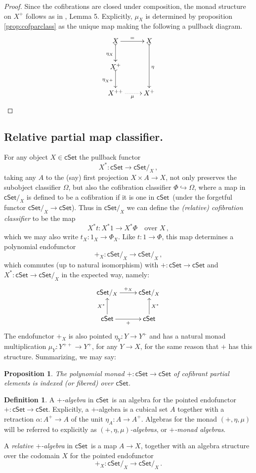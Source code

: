 \documentclass[11pt,reqno]{amsart}
\newcommand{\cSet}{\ensuremath{\mathsf{cSet}}}
\newcommand{\hook}{\ensuremath{\hookrightarrow}}
\newcommand{\ra}{\ensuremath{\rightarrow}}
\renewcommand{\to}{\ensuremath{\rightarrow}}
\newcommand{\too}{\ensuremath{\longrightarrow}}
\newtheorem{proposition}[theorem]{Proposition}
\theoremstyle{remark}
\theoremstyle{definition}
\newtheorem{definition}[theorem]{Definition}
\begin{document}
\begin{proof}
Since the cofibrations are closed under composition, the monad structure on $X^+$ follows as in \cite{A:natural}, Lemma 5.  Explicitly, $\mu_X$ is determined by proposition \ref{prop:cofparclass} as the unique map making the following a pullback diagram.
\[
\xymatrix{
X \ar@{>->}[d]_{\eta_X} \ar[r]^= & X \ar@{>->}[dd]^{\eta}\\
X^+ \ar@{>->}[d]_{\eta_{X^+}} & \\
X^{++} \ar@{.>}[r]_\mu & X^+
}
\]
\end{proof}

\subsection*{Relative partial map classifier.}

For any object $X\in\cSet$ the pullback functor 
\[
X^* : \cSet \ra \cSet/_X\,,
\]
taking any $A$ to the (say) first projection $X\times A \ra X$, not only preserves the subobject classifier $\Omega$, but also the cofibration classifier $\Phi \hook \Omega$, where a map in $\cSet/_X$ is defined to be a cofibration if it is one in \cSet\ (under the forgetful functor $\cSet/_X \to \cSet$). Thus in $\cSet/_X$ we can define the \emph{(relative) cofibration classifier} to be the map
\[
X^*t : X^*1 \too X^*\Phi	\quad\text{over $X$}\,,
\]
which we may also write $t_X : 1_X \ra \Phi_X$.  Like $t : 1\ra \Phi$, this map determines a polynomial endofunctor  
\[
+_X : \cSet/_X \ra \cSet/_X\,,
\]
 which commutes (up to natural isomorphism) with $+ : \cSet \ra \cSet$ and $X^* : \cSet \ra \cSet/_X$ in the expected way, namely:
\begin{equation}\label{diag:+fibered}
\xymatrix{
\cSet/_X \ar[r]^{+_X}& \cSet/_X \\
\cSet \ar[u]^{X^*} \ar[r]_+ & \ar[u]_{X^*}\cSet 
}
\end{equation}
The endofunctor $+_X$ is also pointed $\eta_Y : Y \ra Y^+$ and has a natural monad multiplication $\mu_Y : Y^{++} \ra Y^+$, for any $Y\ra X$, for the same reason that $+$ has this structure.  Summarizing, we may say:

\begin{proposition}\label{prop:fiberedpolymonad}
The polynomial monad $+ : \cSet \ra \cSet$ of \emph{cofibrant partial elements} is indexed (or fibered) over \cSet.
\end{proposition}

\begin{definition}\label{def:+alg}
A \emph{$+$-algebra} in \cSet\ is an algebra for the pointed endofunctor $+ : \cSet\ra \cSet$.  Explicitly, a $+$-algebra is a cubical set $A$ together with a retraction $\alpha : A^+\ra A$ of the unit $\eta_A : A \ra A^+$.  Algebras for the monad $(+, \eta, \mu)$ will be referred to explicitly as \emph{$(+, \eta, \mu)$-algebras}, or \emph{$+$-monad algebras}. 

A \emph{relative $+$-algebra} in \cSet\ is a map $A \ra X$, together with an algebra structure over the codomain $X$ for the pointed endofunctor 
\[
+_X : \cSet/_X \too \cSet/_X\,.
\]
\end{definition}
\end{document}
